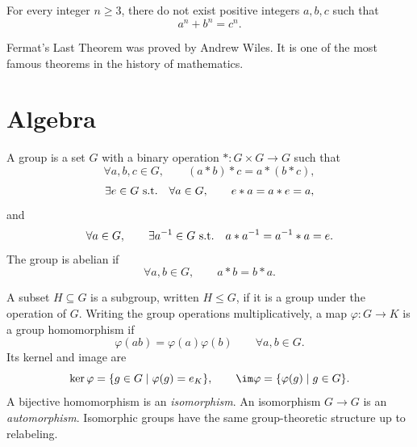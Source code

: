     \begin{theorem}
        For every integer $n\geq 3$, there do not exist positive integers
        $a,b,c$ such that
        \[
            a^n+b^n=c^n.
        \]
    \end{theorem}

    \begin{remark}
        Fermat's Last Theorem was proved by Andrew Wiles. It is one of the most
        famous theorems in the history of mathematics.
    \end{remark}

    \chapter{Algebra}



    \begin{definition}[Group]
        A group is a set $G$ with a binary operation $\ast\colon G\times G\to G$ such that
        \[
            \forall a,b,c\in G,
            \qquad
            (a\ast b)\ast c=a\ast(b\ast c),
        \]
        \[
            \exists e\in G\ \textnormal{s.t.}\quad
            \forall a\in G,
            \qquad
            e\ast a=a\ast e=a,
        \]
        and
        \[
            \forall a\in G,
            \qquad
            \exists a^{-1}\in G\ \textnormal{s.t.}\quad
            a\ast a^{-1}=a^{-1}\ast a=e.
        \]
        The group is abelian if
        \[
            \forall a,b\in G,
            \qquad
            a\ast b=b\ast a.
        \]
    \end{definition}


    \begin{definition}
        A subset $H\subseteq G$ is a subgroup, written $H\leq G$, if it is a
        group under the operation of $G$. Writing the group operations
        multiplicatively, a map $\varphi\colon G\to K$ is a group
        homomorphism if
        \[
            \varphi(ab)=\varphi(a)\varphi(b)
            \qquad
            \forall a,b\in G.
        \]
        Its kernel and image are
        \[
            \ker\varphi=\{g\in G\mid\varphi(g)=e_K\},
            \qquad
            \im\varphi=\{\varphi(g)\mid g\in G\}.
        \]
        A bijective homomorphism is an \emph{isomorphism}. An isomorphism
        $G\to G$ is an \emph{automorphism}. Isomorphic groups have the same
        group-theoretic structure up to relabeling.
    \end{definition}

